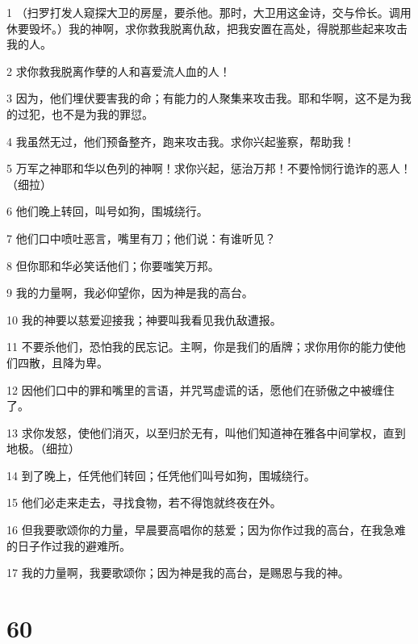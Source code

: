 \par 1 （扫罗打发人窥探大卫的房屋，要杀他。那时，大卫用这金诗，交与伶长。调用休要毁坏。）我的神啊，求你救我脱离仇敌，把我安置在高处，得脱那些起来攻击我的人。
\par 2 求你救我脱离作孽的人和喜爱流人血的人！
\par 3 因为，他们埋伏要害我的命；有能力的人聚集来攻击我。耶和华啊，这不是为我的过犯，也不是为我的罪愆。
\par 4 我虽然无过，他们预备整齐，跑来攻击我。求你兴起鉴察，帮助我！
\par 5 万军之神耶和华以色列的神啊！求你兴起，惩治万邦！不要怜悯行诡诈的恶人！（细拉）
\par 6 他们晚上转回，叫号如狗，围城绕行。
\par 7 他们口中喷吐恶言，嘴里有刀；他们说：有谁听见？
\par 8 但你耶和华必笑话他们；你要嗤笑万邦。
\par 9 我的力量啊，我必仰望你，因为神是我的高台。
\par 10 我的神要以慈爱迎接我；神要叫我看见我仇敌遭报。
\par 11 不要杀他们，恐怕我的民忘记。主啊，你是我们的盾牌；求你用你的能力使他们四散，且降为卑。
\par 12 因他们口中的罪和嘴里的言语，并咒骂虚谎的话，愿他们在骄傲之中被缠住了。
\par 13 求你发怒，使他们消灭，以至归於无有，叫他们知道神在雅各中间掌权，直到地极。（细拉）
\par 14 到了晚上，任凭他们转回；任凭他们叫号如狗，围城绕行。
\par 15 他们必走来走去，寻找食物，若不得饱就终夜在外。
\par 16 但我要歌颂你的力量，早晨要高唱你的慈爱；因为你作过我的高台，在我急难的日子作过我的避难所。
\par 17 我的力量啊，我要歌颂你；因为神是我的高台，是赐恩与我的神。

\chapter{60}

